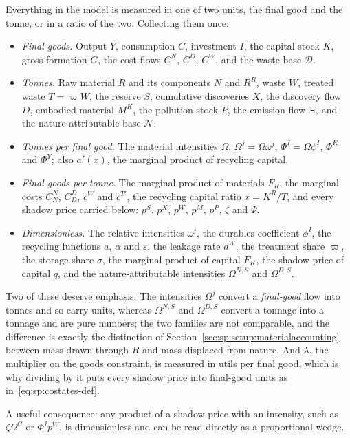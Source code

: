 Everything in the model is measured in one of two units, the final good and the tonne, or in a ratio of the two. Collecting them once:
\begin{itemize}
\item \emph{Final goods.} Output $Y$, consumption $C$, investment $I$, the capital stock $K$, gross formation $G$, the cost flows $C^N$, $C^D$, $C^W$, and the waste base $\mathcal D$.
\item \emph{Tonnes.} Raw material $R$ and its components $N$ and $R^R$, waste $W$, treated waste $T=\varpi W$, the reserve $S$, cumulative discoveries $X$, the discovery flow $D$, embodied material $M^K$, the pollution stock $P$, the emission flow $\Xi$, and the nature-attributable base $\mathcal N$.
\item \emph{Tonnes per final good.} The material intensities $\Omega$, $\Omega^j=\Omega\omega^j$, $\Phi^I=\Omega\phi^I$, $\Phi^K$ and $\Phi^Y$; also $a'\left(x\right)$, the marginal product of recycling capital.
\item \emph{Final goods per tonne.} The marginal product of materials $F_R$, the marginal costs $C^N_N$, $C^D_D$, $c^W$ and $c^{T\prime}$, the recycling capital ratio $x=K^R/T$, and every shadow price carried below: $p^S$, $p^X$, $p^W$, $p^M$, $p^P$, $\zeta$ and $\Psi$.
\item \emph{Dimensionless.} The relative intensities $\omega^j$, the durables coefficient $\phi^I$, the recycling functions $a$, $\alpha$ and $\varepsilon$, the leakage rate $d^W$, the treatment share $\varpi$, the storage share $\sigma$, the marginal product of capital $F_K$, the shadow price of capital $q$, and the nature-attributable intensities $\Omega^{N,S}$ and $\Omega^{D,S}$.
\end{itemize}
Two of these deserve emphasis. The intensities $\Omega^j$ convert a \emph{final-good} flow into tonnes and so carry units, whereas $\Omega^{N,S}$ and $\Omega^{D,S}$ convert a tonnage into a tonnage and are pure numbers; the two families are not comparable, and the difference is exactly the distinction of Section~\ref{sec:sp:setup:materialaccounting} between mass drawn through $R$ and mass displaced from nature. And $\lambda$, the multiplier on the goods constraint, is measured in utils per final good, which is why dividing by it puts every shadow price into final-good units as in~\eqref{eq:sp:costates-def}.

A useful consequence: any product of a shadow price with an intensity, such as $\zeta\Omega^C$ or $\Phi^Ip^W$, is dimensionless and can be read directly as a proportional wedge.

